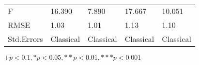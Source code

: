 \begin{table}[th!]
\begin{threeparttable}
\begin{tabular}{lC{3cm}C{3cm}C{3cm}C{3cm}}
              F &           16.390 &                            7.890 &                17.667 &                                10.051 \\
           RMSE &             1.03 &                             1.01 &                  1.13 &                                  1.10 \\
     Std.Errors &        Classical &                        Classical &             Classical &                             Classical \\
\bottomrule
\end{tabular}
\begin{tablenotes}
\item \footnotesize $+ p < 0.1, * p < 0.05, ** p < 0.01, *** p < 0.001$
\end{tablenotes}
\end{threeparttable}
\end{table}
